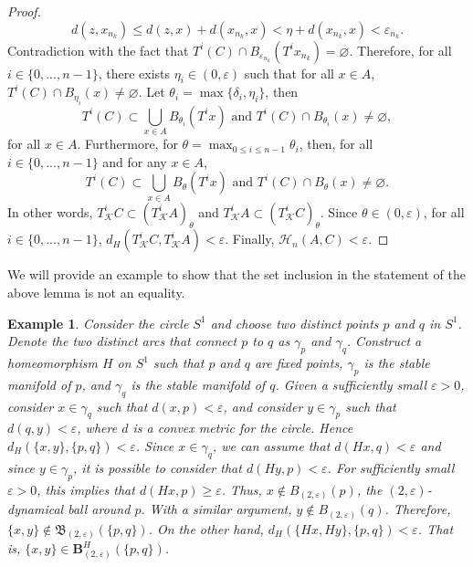 \documentclass[sn-mathphys-num]{sn-jnl}%
\theoremstyle{thmstyleone}%
\theoremstyle{thmstyletwo}%
\newtheorem{example}{Example}%
\theoremstyle{thmstylethree}%
\newcommand*\induce[1]{#1_\mathcal{K}}
\begin{document}
\begin{proof}
    \begin{equation*}
        d(z, x_{n_k}) \leq d(z, x) + d(x_{n_k}, x) < \eta + d(x_{n_k}, x) < \varepsilon_{n_k}.
    \end{equation*}
    Contradiction with the fact that $T^i(C) \cap B_{\varepsilon_{n_k}}(T^ix_{n_k}) = \varnothing$. Therefore, for all $i \in \{0, ..., n - 1\}$, there exists $\eta_i \in (0, \varepsilon)$ such that for all $x \in A$, $T^i(C) \cap B_{\eta_i}(x) \neq \varnothing$. Let $\theta_i = \max\{\delta_i, \eta_i\}$, then
    \begin{equation*}
        T^i(C) \subset \bigcup\limits_{x \in A} B_{\theta_i}(T^ix) \text { and } T^i(C) \cap B_{\theta_i}(x) \neq \varnothing,
    \end{equation*}
    for all $x \in A$. Furthermore, for $\theta = \max_{0 \leq i \leq n - 1} \theta_i$, then, for all $i \in \{0, ..., n - 1\}$ and for any $x \in A$, 
    \begin{equation*}
        T^i(C) \subset \bigcup\limits_{x \in A} B_{\theta}(T^ix) \text { and } T^i(C) \cap B_{\theta}(x) \neq \varnothing.
    \end{equation*}
    In other words, $\induce{T}^iC \subset (\induce{T}^iA)_\theta$ and $\induce{T}^iA \subset (\induce{T}^iC)_\theta$. Since $\theta \in (0, \varepsilon)$, for all $i \in \{0, ..., n - 1\}$, $d_H(\induce{T}^iC, \induce{T}^iA) < \varepsilon$. Finally, $\mathcal{H}_n(A, C) < \varepsilon$.
\end{proof}

We will provide an example to show that the set inclusion in the statement of the above lemma is not an equality.\\

\begin{example}
    Consider the circle $S^1$ and choose two distinct points $p$ and $q$ in $S^1$. Denote the two distinct arcs that connect $p$ to $q$ as $\gamma_p$ and $\gamma_q$. Construct a homeomorphism $H$ on $S^1$ such that $p$ and $q$ are fixed points, $\gamma_p$ is the stable manifold of $p$, and $\gamma_q$ is the stable manifold of $q$. Given a sufficiently small $\varepsilon > 0$, consider $x \in \gamma_q$ such that $d(x, p) < \varepsilon$, and consider $y \in \gamma_p$ such that $d(q, y) < \varepsilon$, where $d$ is a convex metric for the circle. Hence $d_H(\{x, y\}, \{p, q\}) < \varepsilon$. Since $x \in \gamma_q$, we can assume that $d(Hx, q) < \varepsilon$ and since $y \in \gamma_p$, it is possible to consider that $d(Hy, p) < \varepsilon$. For sufficiently small $\varepsilon > 0$, this implies that $d(Hx, p) \geq \varepsilon$. Thus, $x \notin B_{(2, \varepsilon)}(p)$, the $(2, \varepsilon)$-dynamical ball around $p$. With a similar argument, $y \notin B_{(2, \varepsilon)}(q)$. Therefore, $\{x, y\} \notin \mathfrak{B}_{(2, \varepsilon)}(\{p, q\})$. On the other hand, $d_H(\{Hx, Hy\}, \{p, q\}) < \varepsilon$. That is, $\{x, y\} \in \mathbf{B}^H_{(2, \varepsilon)}(\{p, q\})$.\\
\end{example}
\end{document}
